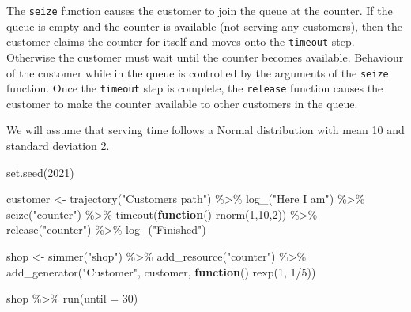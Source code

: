 \documentclass[
]{book}
\newenvironment{Shaded}{\begin{snugshade}}{\end{snugshade}}
\newcommand{\AttributeTok}[1]{\textcolor[rgb]{0.77,0.63,0.00}{#1}}
\newcommand{\ControlFlowTok}[1]{\textcolor[rgb]{0.13,0.29,0.53}{\textbf{#1}}}
\newcommand{\DecValTok}[1]{\textcolor[rgb]{0.00,0.00,0.81}{#1}}
\newcommand{\FunctionTok}[1]{\textcolor[rgb]{0.00,0.00,0.00}{#1}}
\newcommand{\NormalTok}[1]{#1}
\newcommand{\OtherTok}[1]{\textcolor[rgb]{0.56,0.35,0.01}{#1}}
\newcommand{\SpecialCharTok}[1]{\textcolor[rgb]{0.00,0.00,0.00}{#1}}
\newcommand{\StringTok}[1]{\textcolor[rgb]{0.31,0.60,0.02}{#1}}
\begin{document}
The \texttt{seize} function causes the customer to join the queue at the counter. If the queue is empty and the counter is available (not serving any customers), then the customer claims the counter for itself and moves onto the \texttt{timeout} step. Otherwise the customer must wait until the counter becomes available. Behaviour of the customer while in the queue is controlled by the arguments of the \texttt{seize} function. Once the \texttt{timeout} step is complete, the \texttt{release} function causes the customer to make the counter available to other customers in the queue.

We will assume that serving time follows a Normal distribution with mean 10 and standard deviation 2.

\begin{Shaded}
\begin{Highlighting}[]
\FunctionTok{set.seed}\NormalTok{(}\DecValTok{2021}\NormalTok{)}

\NormalTok{customer }\OtherTok{\textless{}{-}}
  \FunctionTok{trajectory}\NormalTok{(}\StringTok{"Customer\textquotesingle{}s path"}\NormalTok{) }\SpecialCharTok{\%\textgreater{}\%}
  \FunctionTok{log\_}\NormalTok{(}\StringTok{"Here I am"}\NormalTok{) }\SpecialCharTok{\%\textgreater{}\%}
  \FunctionTok{seize}\NormalTok{(}\StringTok{"counter"}\NormalTok{) }\SpecialCharTok{\%\textgreater{}\%}
  \FunctionTok{timeout}\NormalTok{(}\ControlFlowTok{function}\NormalTok{() }\FunctionTok{rnorm}\NormalTok{(}\DecValTok{1}\NormalTok{,}\DecValTok{10}\NormalTok{,}\DecValTok{2}\NormalTok{)) }\SpecialCharTok{\%\textgreater{}\%}
  \FunctionTok{release}\NormalTok{(}\StringTok{"counter"}\NormalTok{) }\SpecialCharTok{\%\textgreater{}\%}
  \FunctionTok{log\_}\NormalTok{(}\StringTok{"Finished"}\NormalTok{)}

\NormalTok{shop }\OtherTok{\textless{}{-}}
  \FunctionTok{simmer}\NormalTok{(}\StringTok{"shop"}\NormalTok{) }\SpecialCharTok{\%\textgreater{}\%}
  \FunctionTok{add\_resource}\NormalTok{(}\StringTok{"counter"}\NormalTok{) }\SpecialCharTok{\%\textgreater{}\%}
  \FunctionTok{add\_generator}\NormalTok{(}\StringTok{"Customer"}\NormalTok{, customer, }\ControlFlowTok{function}\NormalTok{() }\FunctionTok{rexp}\NormalTok{(}\DecValTok{1}\NormalTok{, }\DecValTok{1}\SpecialCharTok{/}\DecValTok{5}\NormalTok{))}

\NormalTok{shop }\SpecialCharTok{\%\textgreater{}\%} \FunctionTok{run}\NormalTok{(}\AttributeTok{until =} \DecValTok{30}\NormalTok{)}
\end{Highlighting}
\end{Shaded}
\end{document}

